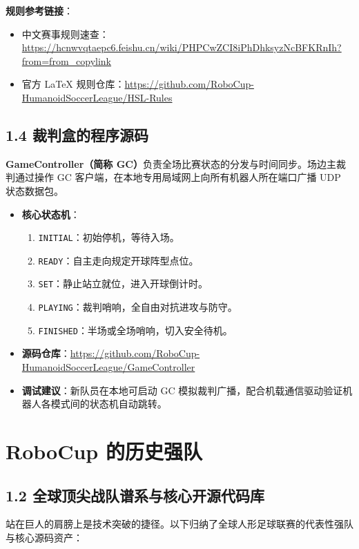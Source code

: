 \documentclass[11pt,a4paper]{ctexart}
\begin{document}
\textbf{规则参考链接}：
\begin{itemize}
    \item 中文赛事规则速查：\url{https://hcnwvqtaepc6.feishu.cn/wiki/PHPCwZCI8iPhDhksyzNcBFKRnIh?from=from_copylink}
    \item 官方 LaTeX 规则仓库：\url{https://github.com/RoboCup-HumanoidSoccerLeague/HSL-Rules}
\end{itemize}

\subsection{1.4 裁判盒的程序源码}
\textbf{GameController（简称 GC）}负责全场比赛状态的分发与时间同步。场边主裁判通过操作 GC 客户端，在本地专用局域网上向所有机器人所在端口广播 UDP 状态数据包。

\begin{itemize}[leftmargin=*]
    \item \textbf{核心状态机}：
    \begin{enumerate}
        \item \texttt{INITIAL}：初始停机，等待入场。
        \item \texttt{READY}：自主走向规定开球阵型点位。
        \item \texttt{SET}：静止站立就位，进入开球倒计时。
        \item \texttt{PLAYING}：裁判哨响，全自由对抗进攻与防守。
        \item \texttt{FINISHED}：半场或全场哨响，切入安全待机。
    \end{enumerate}
    \item \textbf{源码仓库}：\url{https://github.com/RoboCup-HumanoidSoccerLeague/GameController}
    \item \textbf{调试建议}：新队员在本地可启动 GC 模拟裁判广播，配合机载通信驱动验证机器人各模式间的状态机自动跳转。
\end{itemize}

\newpage
\section{RoboCup 的历史强队}

\subsection{1.2 全球顶尖战队谱系与核心开源代码库}
站在巨人的肩膀上是技术突破的捷径。以下归纳了全球人形足球联赛的代表性强队与核心源码资产：
\end{document}
